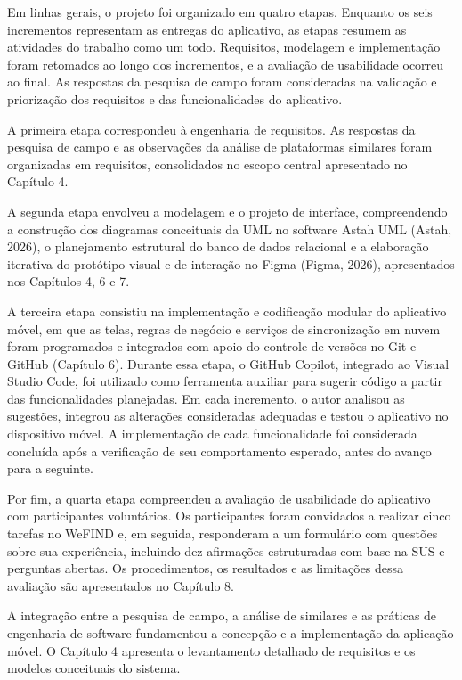 Em linhas gerais, o projeto foi organizado em quatro etapas. Enquanto os seis incrementos representam as entregas do aplicativo, as etapas resumem as atividades do trabalho como um todo. Requisitos, modelagem e implementação foram retomados ao longo dos incrementos, e a avaliação de usabilidade ocorreu ao final. As respostas da pesquisa de campo foram consideradas na validação e priorização dos requisitos e das funcionalidades do aplicativo.

A primeira etapa correspondeu à engenharia de requisitos. As respostas da pesquisa de campo e as observações da análise de plataformas similares foram organizadas em requisitos, consolidados no escopo central apresentado no Capítulo 4.

A segunda etapa envolveu a modelagem e o projeto de interface, compreendendo a construção dos diagramas conceituais da UML no software Astah UML (Astah, 2026), o planejamento estrutural do banco de dados relacional e a elaboração iterativa do protótipo visual e de interação no Figma (Figma, 2026), apresentados nos Capítulos 4, 6 e 7.

A terceira etapa consistiu na implementação e codificação modular do aplicativo móvel, em que as telas, regras de negócio e serviços de sincronização em nuvem foram programados e integrados com apoio do controle de versões no Git e GitHub (Capítulo 6). Durante essa etapa, o GitHub Copilot, integrado ao Visual Studio Code, foi utilizado como ferramenta auxiliar para sugerir código a partir das funcionalidades planejadas. Em cada incremento, o autor analisou as sugestões, integrou as alterações consideradas adequadas e testou o aplicativo no dispositivo móvel. A implementação de cada funcionalidade foi considerada concluída após a verificação de seu comportamento esperado, antes do avanço para a seguinte.

Por fim, a quarta etapa compreendeu a avaliação de usabilidade do aplicativo com participantes voluntários. Os participantes foram convidados a realizar cinco tarefas no WeFIND e, em seguida, responderam a um formulário com questões sobre sua experiência, incluindo dez afirmações estruturadas com base na SUS e perguntas abertas. Os procedimentos, os resultados e as limitações dessa avaliação são apresentados no Capítulo 8.

A integração entre a pesquisa de campo, a análise de similares e as práticas de engenharia de software fundamentou a concepção e a implementação da aplicação móvel. O Capítulo 4 apresenta o levantamento detalhado de requisitos e os modelos conceituais do sistema.
